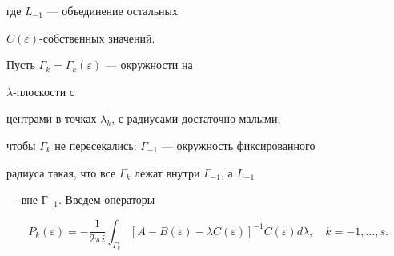 где $L_{-1}$ --- объединение остальных


$C(\varepsilon)$-собственных значений.





Пусть $\Gamma_k=\Gamma_k(\varepsilon)$ --- окружности на


$\lambda$-плоскости с


центрами в точках $\lambda_k$, с радиусами достаточно малыми,


чтобы $\Gamma_k$ не пересекались; $\Gamma_{-1}$ --- окружность фиксированного


радиуса такая, что все $\Gamma_k$ лежат внутри $\Gamma_{-1}$, а $L_{-1}$


--- вне $Г_{-1}$. Введем операторы


$$


P_k(\varepsilon)=-\frac{1}{2\pi i}\int_{\Gamma_{k}}[A-B(\varepsilon)-


\lambda C(\varepsilon)]^{-1}C(\varepsilon)d\lambda,\quad k=-1,\dotsc, s.


$$





